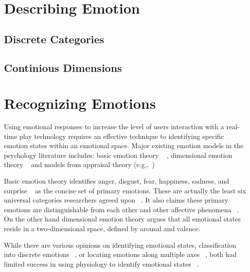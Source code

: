 \documentclass{uofsthesis-cs}
\begin{document}
\section{Describing Emotion}

\subsection{Discrete Categories}

\subsection{Continious Dimensions}

\section{Recognizing Emotions}

Using emotional responses to increase the level of users interaction with a real-time play technology requires an effective technique to identifying specific emotion states within an emotional space. Major existing emotion models in the psychology literature includes: basic emotion theory ~\cite{ekman1992argument, ekman1992there} , dimensional emotion theory ~\cite{lang1995emotion, russell1980circumplex} and models from appraisal theory (e.g.,~\cite{roseman2001model}) ~\cite{zhang2010service}

Basic emotion theory identifies anger, disgust, fear, happiness, sadness, and surprise ~\cite{peter2006emotion} as the concise set of primary emotions. These are actually the least six universal categories researchers agreed upon ~\cite{zagalo2004story}. It also claims these primary emotions are distinguishable from each other and other affective phenomena ~\cite{dalgleish1999handbook}. On the other hand dimensional emotion theory argues that all emotional states reside in a two-dimensional space, defined by arousal and valence.

While there are various opinions on identifying emotional states, classification into discrete emotions ~\cite{dalgleish1999handbook}, or locating emotions along multiple axes ~\cite{russell1989affect, lang1995emotion}, both had limited success in using physiology to identify emotional states ~\cite{cacioppo2000psychophysiology}.
\end{document}
